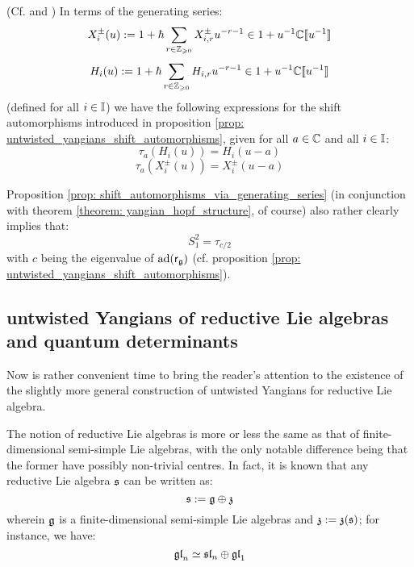         \begin{proposition} \label{prop: shift_automorphisms_via_generating_series}
            (Cf. \cite[Subsection 2.8]{gautam_and_toledano_laredo_yangians_quantum_loop_algebras_and_abelian_difference_equations} and \cite[Remark 2.4]{wendlandt_formal_shift_operators_on_yangian_doubles}) In terms of the generating series:
                $$X_i^{\pm}(u) := 1 + \hbar \sum_{r \in \mathbb{Z}_{\geqslant 0}} X_{i, r}^{\pm} u^{-r - 1} \in 1 + u^{-1} \mathbb{C}[\![u^{-1}]\!]$$
                $$H_i(u) := 1 + \hbar \sum_{r \in \mathbb{Z}_{\geqslant 0}} H_{i, r} u^{-r - 1} \in 1 + u^{-1} \mathbb{C}[\![u^{-1}]\!]$$
            (defined for all $i \in \mathbb{I}$) we have the following expressions for the shift automorphisms introduced in proposition \ref{prop: untwisted_yangians_shift_automorphisms}, given for all $a \in \mathbb{C}$ and all $i \in \mathbb{I}$:
                $$\tau_a(H_i(u)) = H_i(u - a)$$
                $$\tau_a(X_i^{\pm}(u)) = X_i^{\pm}(u - a)$$
        \end{proposition}
        \begin{remark}
            Proposition \ref{prop: shift_automorphisms_via_generating_series} (in conjunction with theorem \ref{theorem: yangian_hopf_structure}, of course) also rather clearly implies that:
                $$S_1^2 = \tau_{c/2}$$
            with $c$ being the eigenvalue of $\mathrm{ad}(\mathsf{r}_{\mathfrak{g}})$ (cf. proposition \ref{prop: untwisted_yangians_shift_automorphisms}).
        \end{remark}

    \subsection{untwisted Yangians of reductive Lie algebras and quantum determinants} \label{subsection: yangians_of_reductive_lie_algebras}
        Now is rather convenient time to bring the reader's attention to the existence of the slightly more general construction of untwisted Yangians for reductive Lie algebra.

        The notion of reductive Lie algebras is more or less the same as that of finite-dimensional semi-simple Lie algebras, with the only notable difference being that the former have possibly non-trivial centres. In fact, it is known that any reductive Lie algebra $\mathfrak{s}$ can be written as:
            $$\mathfrak{s} := \mathfrak{g} \oplus \mathfrak{z}$$
        wherein $\mathfrak{g}$ is a finite-dimensional semi-simple Lie algebras and $\mathfrak{z} := \mathfrak{z}(\mathfrak{s})$; for instance, we have:
            $$\mathfrak{gl}_n \simeq \mathfrak{sl}_n \oplus \mathfrak{gl}_1$$

